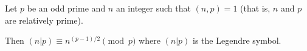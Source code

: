 \documentclass{article}
\begin{document}
Let $p$ be an odd prime and $n$ an integer such that $(n,p)=1$ (that is, $n$ and $p$ are relatively prime).

Then $(n|p)\equiv n^{(p-1)/2}\pmod{p}$ where $(n|p)$ is the Legendre symbol.
\end{document}
